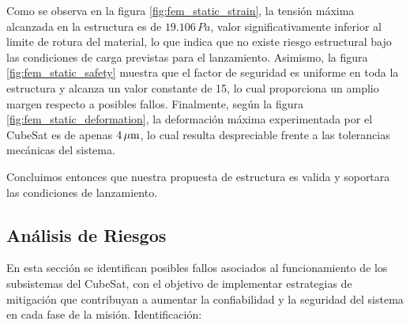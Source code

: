       Como se observa en la figura \ref{fig:fem_static_strain}, la tensión máxima alcanzada en la estructura es de
      $19.106 \, Pa$, valor significativamente inferior al limite de rotura del material, lo que indica que no existe
      riesgo estructural bajo las condiciones de carga previstas para el lanzamiento. Asimismo, la figura
      \ref{fig:fem_static_safety} muestra que el factor de seguridad es uniforme en toda la estructura y alcanza un
      valor constante de 15, lo cual proporciona un amplio margen respecto a posibles fallos. Finalmente, según la
      figura \ref{fig:fem_static_deformation}, la deformación máxima experimentada por el CubeSat es de apenas $4\,\mathrm{\mu m}$,
      lo cual resulta despreciable frente a las tolerancias mecánicas del sistema.

      Concluimos entonces que nuestra propuesta de estructura es valida y soportara las condiciones de lanzamiento.

  \subsection{Análisis de Riesgos}
    En esta sección se identifican posibles fallos asociados al funcionamiento de los subsistemas
    del CubeSat, con el objetivo de implementar estrategias de mitigación que contribuyan a
    aumentar la confiabilidad y la seguridad del sistema en cada fase de la misión. Identificación:

